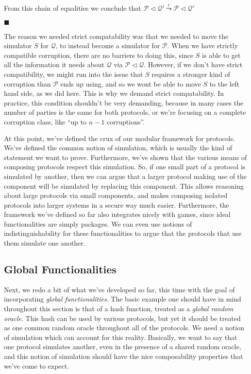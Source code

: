 \begin{theorem}
  From this chain of equalities we conclude that
  $\mathscr{P} \lhd \mathscr{Q}' \overset{\epsilon}{\leadsto} \mathscr{P} \lhd \mathscr{Q}'$

  $\blacksquare$
\end{theorem}

The reason we needed strict compatability was that we needed
to move the simulator $S$ for $\mathscr{Q}$, to instead
become a simulator for $\mathscr{P}$.
When we have strictly compatible corruption, there are no barriers
to doing this, since $S$ is able to get all the information
it needs about $\mathscr{Q}$ via $\mathscr{P} \lhd \mathscr{Q}$.
However, if we don't have strict compatibility,
we might run into the issue that $S$ requires a stronger kind
of corruption than $\mathscr{P}$ ends up using,
and so we wont be able to move $S$ to the left hand side,
as we did here.
This is why we demand strict compatability.
In practice, this condition shouldn't be very demanding,
because in many cases the number of parties is the same for both protocols,
or we're focusing on a complete corruption class, like ``up to $n - 1$ corruptions''.

At this point, we've defined the crux of our modular framework for protocols.
We've defined the common notion of simulation, which is usually
the kind of statement we want to prove.
Furthermore, we've shown that the various means of composing
protocols respect this simulation.
So, if one small part of a protocol is simulated by another,
then we can argue that a larger protocol making use of the component
will be simulated by replacing this component.
This allows reasoning about large protocols via small components,
and makes composing isolated protocols into larger systems
in a secure way much easier.
Furthermore, the framework we've defined so far
also integrates nicely with games, since ideal functionalities
are simply packages.
We can even use notions of indistinguishability for these functionalities
to argue that the protocols that use them simulate one another.

\subsection{Global Functionalities}

Next, we redo a bit of what we've developed so far, this time
with the goal of incorporating \emph{global functionalities}.
The basic example one should have in mind throughout this section
is that of a hash function, treated as a \emph{global random oracle}.
This hash can be used by various protocols, but yet it should
be treated as one common random oracle throughout all of the protocols.
We need a notion of simulation which can account for this reality.
Basically, we want to say that one protocol simulates another,
even in the presence of a shared random oracle,
and this notion of simulation should have the nice composability properties
that we've come to expect.

